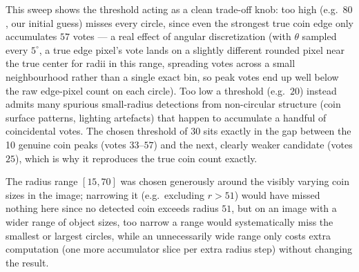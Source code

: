 \documentclass[11pt]{article}
\begin{document}
This sweep shows the threshold acting as a clean trade-off knob: too high (e.g.\ $80$, our
initial guess) misses every circle, since even the strongest true coin edge only accumulates
$57$ votes --- a real effect of angular discretization (with $\theta$ sampled every
$5^\circ$, a true edge pixel's vote lands on a slightly different rounded pixel near the true
center for radii in this range, spreading votes across a small neighbourhood rather than a
single exact bin, so peak votes end up well below the raw edge-pixel count on each circle).
Too low a threshold (e.g.\ $20$) instead admits many spurious small-radius detections from
non-circular structure (coin surface patterns, lighting artefacts) that happen to
accumulate a handful of coincidental votes. The chosen threshold of $30$ sits exactly in the
gap between the 10 genuine coin peaks (votes $33$--$57$) and the next, clearly weaker
candidate (votes $25$), which is why it reproduces the true coin count exactly.

The radius range $[15,70]$ was chosen generously around the visibly varying coin sizes in
the image; narrowing it (e.g.\ excluding $r>51$) would have missed nothing here since no
detected coin exceeds radius $51$, but on an image with a wider range of object sizes, too
narrow a range would systematically miss the smallest or largest circles, while an
unnecessarily wide range only costs extra computation (one more accumulator slice per extra
radius step) without changing the result.
\end{document}
